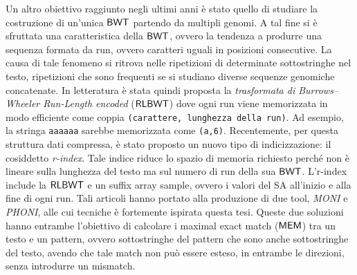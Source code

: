 \documentclass[a4paper,11pt, oneside,italian]{article}
\def\RLBWT{\mbox{\rm {\sf RLBWT}}}
\def\MEM{\mbox{\rm {\sf MEM}}}
\def\BWT{\mbox{\rm {\sf BWT}}}
\begin{document}
Un altro obiettivo raggiunto negli ultimi anni è stato quello di studiare la
costruzione di un'unica $\BWT$ partendo da multipli genomi.
A tal fine si è sfruttata una caratteristica della $\BWT$, ovvero la
tendenza a produrre una sequenza formata da run, ovvero caratteri uguali in
posizioni consecutive. La causa di tale fenomeno si ritrova nelle ripetizioni di
determinate sottostringhe nel testo, ripetizioni che sono frequenti se si
studiano diverse sequenze genomiche concatenate.
%
In letteratura è stata quindi proposta la \textit{trasformata di
  Burrows--Wheeler 
  Run-Length encoded} ($\RLBWT$) dove ogni run viene memorizzata in modo
efficiente 
come coppia \texttt{(carattere, lunghezza della run)}. Ad esempio, la stringa
\texttt{aaaaaa} sarebbe memorizzata come \texttt{(a,6)}.
Recentemente, per questa struttura dati compressa, è stato proposto un nuovo
tipo di indicizzazione: il cosiddetto \textit{r-index}. Tale indice riduce lo
spazio di memoria richiesto perché non è lineare sulla lunghezza del testo ma
sul numero di run della sua $\BWT$.
L'r-index include la
$\RLBWT$ e un suffix array sample, ovvero i valori del SA all’inizio e alla fine
di ogni run. 
Tali articoli hanno portato alla produzione di due tool, \textit{MONI} e 
\textit{PHONI}, alle cui tecniche è fortemente ispirata questa tesi. Queste due
soluzioni hanno entrambe l'obiettivo di 
calcolare i maximal exact match ($\MEM$) tra un testo e un pattern, ovvero
sottostringhe del pattern che 
sono anche sottostringhe del testo, avendo che tale match non può essere esteso,
in entrambe le direzioni, senza introdurre un mismatch. 
\end{document}
